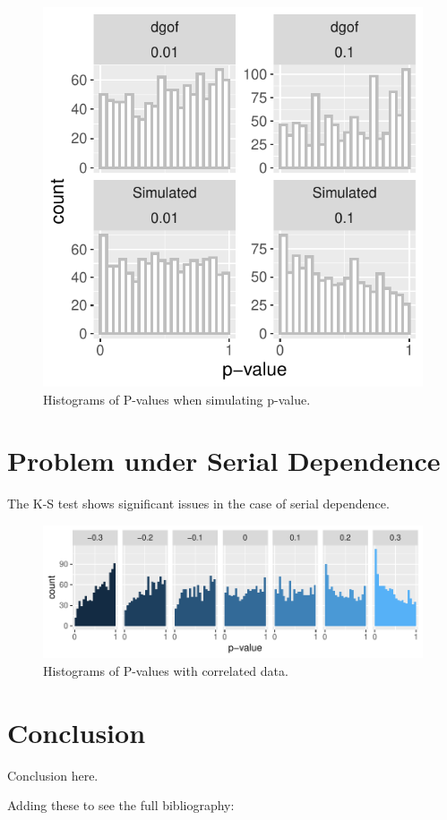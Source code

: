 \documentclass[12pt, letterpaper, titlepage]{article}
\begin{document}
\begin{figure}[!ht]
  \centering
  \includegraphics[width=0.8\linewidth]{hist_dgofsim}
  \caption{Histograms of P-values when simulating p-value.}
  \label{fig:hist_dgofsim}
\end{figure}

\hypertarget{sec:correlation}{%
\section{Problem under Serial Dependence}\label{sec:correlation}}

The K-S test shows significant issues in the case of serial dependence.

\begin{figure}[!ht]
  \centering
  \includegraphics[width=0.8\linewidth]{hist_correlation}
  \caption{Histograms of P-values with correlated data.}
  \label{fig:hist_correlation}
\end{figure}

\hypertarget{sec:conclusion}{%
\section{Conclusion}\label{sec:conclusion}}

Conclusion here.

Adding these to see the full bibliography: 

\citet{Steinskog}
\citet{Weiss}
\citet{Massey}
\citet{Lilliefors}



\end{document}
